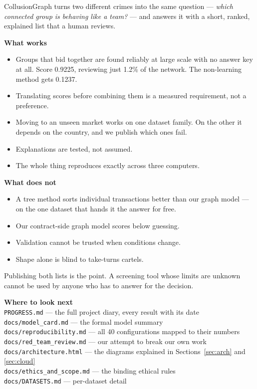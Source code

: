 \documentclass[11pt,a4paper]{article}
\newcommand{\code}[1]{\texttt{\small #1}}
\begin{document}
\begin{keybox}
CollusionGraph turns two different crimes into the same question --- \emph{which
connected group is behaving like a team?} --- and answers it with a short, ranked,
explained list that a human reviews.

\textbf{What works}
\begin{itemize}
  \item Groups that bid together are found reliably at large scale with no answer
        key at all. Score 0.9225, reviewing just 1.2\% of the network. The
        non-learning method gets 0.1237.
  \item Translating scores before combining them is a measured requirement, not a
        preference.
  \item Moving to an unseen market works on one dataset family. On the other it
        depends on the country, and we publish which ones fail.
  \item Explanations are tested, not assumed.
  \item The whole thing reproduces exactly across three computers.
\end{itemize}

\textbf{What does not}
\begin{itemize}
  \item A tree method sorts individual transactions better than our graph model
        --- on the one dataset that hands it the answer for free.
  \item Our contract-side graph model scores below guessing.
  \item Validation cannot be trusted when conditions change.
  \item Shape alone is blind to take-turns cartels.
\end{itemize}

Publishing both lists is the point. A screening tool whose limits are unknown
cannot be used by anyone who has to answer for the decision.
\end{keybox}

\vspace{1em}
\begin{plain}
\textbf{Where to look next}\\
\code{PROGRESS.md} --- the full project diary, every result with its date\\
\code{docs/model\_card.md} --- the formal model summary\\
\code{docs/reproducibility.md} --- all 40 configurations mapped to their numbers\\
\code{docs/red\_team\_review.md} --- our attempt to break our own work\\
\code{docs/architecture.html} --- the diagrams explained in Sections~\ref{sec:arch} and \ref{sec:cloud}\\
\code{docs/ethics\_and\_scope.md} --- the binding ethical rules\\
\code{docs/DATASETS.md} --- per-dataset detail
\end{plain}
\end{document}
